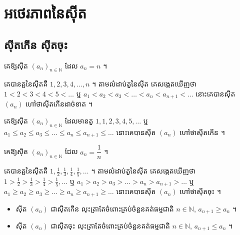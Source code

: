 \section{អថេរភាពនៃស៊ីត}
\subsection{ស៊ីតកើន ស៊ីតចុះ}

\begin{example}[ឧទាហរណ៍ ១]
គេឱ្យស៊ីត $(a_n)_{n \in \mathbb{N}}$ ដែល $a_n = n$ ។

គេបានតួនៃស៊ីតគឺ $1, 2, 3, 4, \ldots, n$ ។ តាមលំដាប់តួនៃស៊ីត គេសង្កេតឃើញថា $1 < 2 < 3 < 4 < 5 < \ldots$ ឬ $a_1 < a_2 < a_3 < \ldots < a_n < a_{n+1} < \ldots$ នោះគេបានស៊ីត $(a_n)$ ហៅថាស៊ីតកើនដាច់ខាត ។
\end{example}

\begin{example}[ឧទាហរណ៍ ២]
គេឱ្យស៊ីត $(a_n)_{n \in \mathbb{N}}$ ដែលមានតួ $1, 1, 2, 3, 4, 5, \ldots$ ឬ $a_1 \le a_2 \le a_3 \le \ldots \le a_n \le a_{n+1} \le \ldots$ នោះគេបានស៊ីត $(a_n)$ ហៅថាស៊ីតកើន ។
\end{example}

\begin{example}[ឧទាហរណ៍ ៣]
គេឱ្យស៊ីត $(a_n)_{n \in \mathbb{N}}$ ដែល $a_n = \dfrac{1}{n}$ ។

គេបានតួនៃស៊ីតគឺ $1, \frac{1}{2}, \frac{1}{3}, \frac{1}{4}, \frac{1}{5}, \ldots$ ។ តាមលំដាប់តួនៃស៊ីត គេសង្កេតឃើញថា $1 > \frac{1}{2} > \frac{1}{3} > \frac{1}{4} > \frac{1}{5}, \ldots$ ឬ $a_1 > a_2 > a_3 > \ldots > a_n > a_{n+1} > \ldots$ ឬ $a_1 \ge a_2 \ge a_3 \ge \ldots \ge a_n \ge a_{n+1} \ge \ldots$ នោះគេបានស៊ីត $(a_n)$ ហៅថាស៊ីតចុះ ។
\end{example}

\begin{definition}
\begin{itemize}
  \item ស៊ីត $(a_n)$ ជាស៊ីតកើន លុះត្រាតែចំពោះគ្រប់ចំនួនគត់ធម្មជាតិ $n \in \mathbb{N}$, $a_{n+1} \ge a_n$ ។
  \item ស៊ីត $(a_n)$ ជាស៊ីតចុះ លុះត្រាតែចំពោះគ្រប់ចំនួនគត់ធម្មជាតិ $n \in \mathbb{N}$, $a_{n+1} \le a_n$ ។
\end{itemize}
\end{definition}

